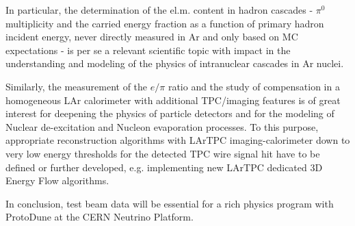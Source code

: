 \documentclass[11pt, oneside]{article}   	%
\begin{document}
In particular, the determination of the el.m. content in hadron cascades - $\pi^0$ multiplicity and the carried energy fraction as a function of primary hadron incident energy, never directly measured in Ar and only based on MC expectations - is per se a relevant scientific topic with impact in the understanding and modeling of the physics of intranuclear cascades in Ar nuclei.

Similarly, the measurement of the $e/\pi$ ratio and the study of compensation in a homogeneous LAr calorimeter with additional
 TPC/imaging features is of great interest for deepening the physics of particle detectors and for the modeling of Nuclear de-excitation and Nucleon evaporation processes. To this purpose,
 appropriate reconstruction algorithms with  LArTPC imaging-calorimeter down to very low energy thresholds for the detected TPC wire signal hit have to be defined or further developed, e.g. implementing new LArTPC dedicated 3D Energy Flow algorithms.
 
In conclusion, test beam data will be essential for a rich physics program with ProtoDune at the CERN Neutrino Platform.
\end{document}
